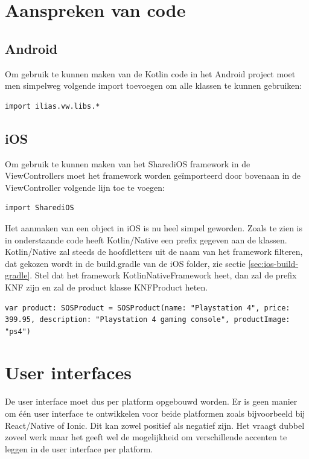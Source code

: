 \section{Aanspreken van code}
\subsection{Android}
Om gebruik te kunnen maken van de Kotlin code in het Android project moet men simpelweg volgende import toevoegen om alle klassen te kunnen gebruiken: 

\begin{lstlisting}
import ilias.vw.libs.*
\end{lstlisting}

\subsection{iOS}
Om gebruik te kunnen maken van het SharediOS framework in de ViewControllers moet het framework worden geïmporteerd door bovenaan in de ViewController volgende lijn toe te voegen:

\begin{lstlisting}
import SharediOS
\end{lstlisting}

Het aanmaken van een object in iOS is nu heel simpel geworden. Zoals te zien is in onderstaande code heeft Kotlin/Native een prefix gegeven aan de klassen. Kotlin/Native zal steeds de hoofdletters uit de naam van het framework filteren, dat gekozen wordt in de build.gradle van de iOS folder, zie sectie \ref{sec:ios-build-gradle}. Stel dat het framework KotlinNativeFramework heet, dan zal de prefix KNF zijn en zal de product klasse KNFProduct heten.

\begin{lstlisting}
var product: SOSProduct = SOSProduct(name: "Playstation 4", price: 399.95, description: "Playstation 4 gaming console", productImage: "ps4")
\end{lstlisting}

\section{User interfaces}
De user interface moet dus per platform opgebouwd worden. Er is geen manier om één user interface te ontwikkelen voor beide platformen zoals bijvoorbeeld bij React/Native of Ionic. Dit kan zowel positief als negatief zijn. Het vraagt dubbel zoveel werk maar het geeft wel de mogelijkheid om verschillende accenten te leggen in de user interface per platform.

